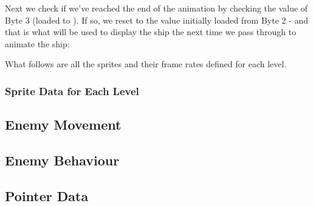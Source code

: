 %


Next we check if we've reached the end of the animation by checking the value
of Byte 3 (loaded to ).  If so,
we reset  to the value initially
loaded from Byte 2 - and that is what will be used to display the ship the next
time we pass through to animate the ship:

%


What follows are all the sprites and their frame rates defined for each level.

\subsubsection{Sprite Data for Each Level}


\subsection{Enemy Movement}



\subsection{Enemy Behaviour}



\subsection{Pointer Data}



